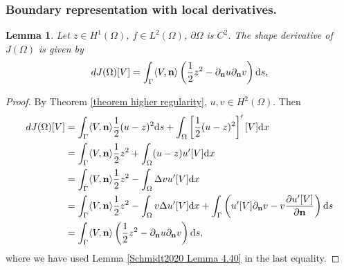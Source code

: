 \documentclass[oneside,11pt]{book}
\numberwithin{equation}{section}
\newtheorem{lemma}{Lemma}[section]
\begin{document}
\subsubsection{Boundary representation with local derivatives.}
\begin{lemma}
    Let $z\in H^1(\Omega)$, $f\in L^2(\Omega)$, $\partial\Omega$ is $C^2$. The shape derivative of $J(\Omega)$ is given by
    \begin{align}
        \label{shape derivative: boundary representation}
        dJ(\Omega)[V] = \int_\Gamma \langle V,{\bf n}\rangle\left(\frac{1}{2}z^2 - \partial_{\bf n}u\partial_{\bf n}v\right){\rm d}s,
    \end{align}
\end{lemma}

\begin{proof}
    By Theorem \ref{theorem higher regularity}, $u,v\in H^2(\Omega)$. Then
    \begin{align}
        dJ(\Omega)[V] &= \int_\Gamma \langle V,{\bf n}\rangle\frac{1}{2}(u - z)^2{\rm d}s + \int_\Omega \left[\frac{1}{2}(u - z)^2\right]'[V]{\rm d}x\\
        &= \int_\Gamma \langle V,{\bf n}\rangle\frac{1}{2}z^2 + \int_\Omega (u - z)u'[V]{\rm d}x\\
        &= \int_\Gamma \langle V,{\bf n}\rangle\frac{1}{2}z^2 - \int_\Omega \Delta vu'[V]{\rm d}x\\
        &= \int_\Gamma \langle V,{\bf n}\rangle\frac{1}{2}z^2 - \int_\Omega v\Delta u'[V]{\rm d}x + \int_\Gamma \left(u'[V]\partial_{\bf n}v - v\frac{\partial u'[V]}{\partial{\bf n}}\right){\rm d}s\\
        &= \int_\Gamma \langle V,{\bf n}\rangle\left(\frac{1}{2}z^2 - \partial_{\bf n}u\partial_{\bf n}v\right){\rm d}s,
    \end{align}
    where we have used Lemma \ref{Schmidt2020 Lemma 4.40} in the last equality.
\end{proof}
\end{document}
